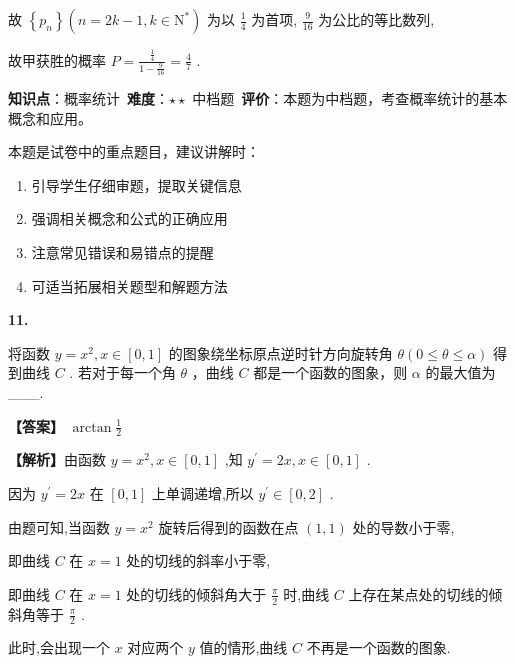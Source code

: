 \documentclass[10pt]{article}
\newenvironment{questionblock}[1]{%
  \needspace{3\baselineskip}%
  \noindent\textbf{#1.}%
}{%
  \par\vspace{1em}%
}
\begin{document}
故 \(\left\{  {p}_{n}\right\}  \left( {n = {2k} - 1, k \in  {\mathrm{N}}^{ * }}\right)\) 为以 \(\frac{1}{4}\) 为首项, \(\frac{9}{16}\) 为公比的等比数列,

故甲获胜的概率 \(P = \frac{\frac{1}{4}}{1 - \frac{9}{16}} = \frac{4}{7}\) .

\begin{analysisbox}[考点分析]
\textbf{知识点}：概率统计\
\textbf{难度}：$\star\star$ 中档题\
\textbf{评价}：本题为中档题，考查概率统计的基本概念和应用。
\end{analysisbox}

\begin{tipbox}[教学提示]
本题是试卷中的重点题目，建议讲解时：
\begin{enumerate}
\item 引导学生仔细审题，提取关键信息
\item 强调相关概念和公式的正确应用
\item 注意常见错误和易错点的提醒
\item 可适当拓展相关题型和解题方法
\end{enumerate}
\end{tipbox}

\begin{questionblock}{11}
将函数 \(y = {x}^{2}, x \in  \left\lbrack  {0,1}\right\rbrack\) 的图象绕坐标原点逆时针方向旋转角 \(\theta \left( {0 \leq  \theta  \leq  \alpha }\right)\) 得到曲线 \(C\) . 若对于每一个角 \(\theta\) ，曲线 \(C\) 都是一个函数的图象，则 \(\alpha\) 的最大值为___.
\end{questionblock}

\textbf{【答案】} \(\arctan \frac{1}{2}\)

\textbf{【解析】}由函数 \(y = {x}^{2}, x \in  \left\lbrack  {0,1}\right\rbrack\) ,知 \({y}^{\prime } = {2x}, x \in  \left\lbrack  {0,1}\right\rbrack\) .

因为 \({y}^{\prime } = {2x}\) 在 \(\left\lbrack  {0,1}\right\rbrack\) 上单调递增,所以 \({y}^{\prime } \in  \left\lbrack  {0,2}\right\rbrack\) .

由题可知,当函数 \(y = {x}^{2}\) 旋转后得到的函数在点 \(\left( {1,1}\right)\) 处的导数小于零,

即曲线 \(C\) 在 \(x = 1\) 处的切线的斜率小于零,

即曲线 \(C\) 在 \(x = 1\) 处的切线的倾斜角大于 \(\frac{\pi }{2}\) 时,曲线 \(C\) 上存在某点处的切线的倾斜角等于 \(\frac{\pi }{2}\) .

此时,会出现一个 \(x\) 对应两个 \(y\) 值的情形,曲线 \(C\) 不再是一个函数的图象.
\end{document}
